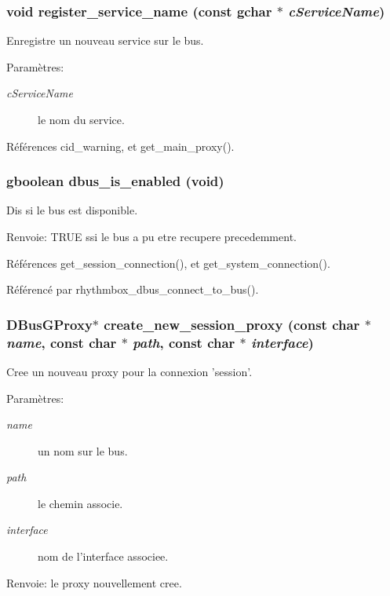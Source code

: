 \subsubsection{\setlength{\rightskip}{0pt plus 5cm}void register\_\-service\_\-name (const gchar $\ast$ {\em cServiceName})}\label{cid-dbus_8h_6c35ea284d5021681d6042d3a92194f0}


Enregistre un nouveau service sur le bus. \begin{Desc}
\item[Paramètres:]
\begin{description}
\item[{\em cServiceName}]le nom du service. \end{description}
\end{Desc}


Références cid\_\-warning, et get\_\-main\_\-proxy().
\subsubsection{\setlength{\rightskip}{0pt plus 5cm}gboolean dbus\_\-is\_\-enabled (void)}\label{cid-dbus_8h_019158a96253e21bc8f797ed7232c2e1}


Dis si le bus est disponible. \begin{Desc}
\item[Renvoie:]TRUE ssi le bus a pu etre recupere precedemment. \end{Desc}


Références get\_\-session\_\-connection(), et get\_\-system\_\-connection().

Référencé par rhythmbox\_\-dbus\_\-connect\_\-to\_\-bus().
\subsubsection{\setlength{\rightskip}{0pt plus 5cm}DBusGProxy$\ast$ create\_\-new\_\-session\_\-proxy (const char $\ast$ {\em name}, \/  const char $\ast$ {\em path}, \/  const char $\ast$ {\em interface})}\label{cid-dbus_8h_8b50e30967e56963f7a35ae93e364107}


Cree un nouveau proxy pour la connexion 'session'. \begin{Desc}
\item[Paramètres:]
\begin{description}
\item[{\em name}]un nom sur le bus. \item[{\em path}]le chemin associe. \item[{\em interface}]nom de l'interface associee. \end{description}
\end{Desc}
\begin{Desc}
\item[Renvoie:]le proxy nouvellement cree. \end{Desc}


